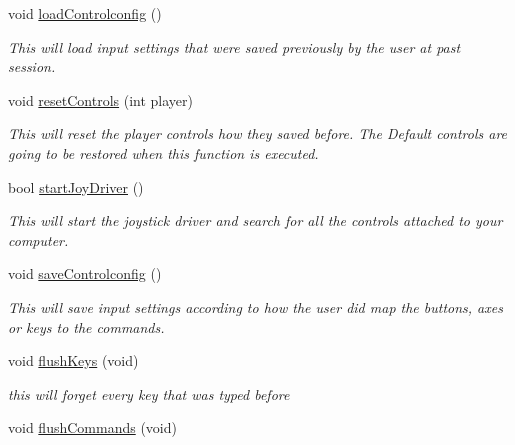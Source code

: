 \begin{DoxyCompactItemize}
\item 
\hypertarget{class_c_input_aecadd65cf7fa6a5928b6b5f0c86b0b5e}{
void \hyperlink{class_c_input_aecadd65cf7fa6a5928b6b5f0c86b0b5e}{loadControlconfig} ()}
\label{class_c_input_aecadd65cf7fa6a5928b6b5f0c86b0b5e}

\begin{DoxyCompactList}\small\item\em This will load input settings that were saved previously by the user at past session. \item\end{DoxyCompactList}\item 
void \hyperlink{class_c_input_a459565c75153405d01e521da2084cd74}{resetControls} (int player)
\begin{DoxyCompactList}\small\item\em This will reset the player controls how they saved before. The Default controls are going to be restored when this function is executed. \item\end{DoxyCompactList}\item 
bool \hyperlink{class_c_input_a5f76503ef7e49c5d6d1ab4eb2a2480e9}{startJoyDriver} ()
\begin{DoxyCompactList}\small\item\em This will start the joystick driver and search for all the controls attached to your computer. \item\end{DoxyCompactList}\item 
\hypertarget{class_c_input_a112be13b91ce115e40c5da66bf590433}{
void \hyperlink{class_c_input_a112be13b91ce115e40c5da66bf590433}{saveControlconfig} ()}
\label{class_c_input_a112be13b91ce115e40c5da66bf590433}

\begin{DoxyCompactList}\small\item\em This will save input settings according to how the user did map the buttons, axes or keys to the commands. \item\end{DoxyCompactList}\item 
\hypertarget{class_c_input_a58d6a8e7cbddae1faffed25e97956d6f}{
void \hyperlink{class_c_input_a58d6a8e7cbddae1faffed25e97956d6f}{flushKeys} (void)}
\label{class_c_input_a58d6a8e7cbddae1faffed25e97956d6f}

\begin{DoxyCompactList}\small\item\em this will forget every key that was typed before \item\end{DoxyCompactList}\item 
\hypertarget{class_c_input_a6716fd1d3fd6f391fd51f05408e40e31}{
void \hyperlink{class_c_input_a6716fd1d3fd6f391fd51f05408e40e31}{flushCommands} (void)}
\label{class_c_input_a6716fd1d3fd6f391fd51f05408e40e31}


\end{DoxyCompactItemize}
